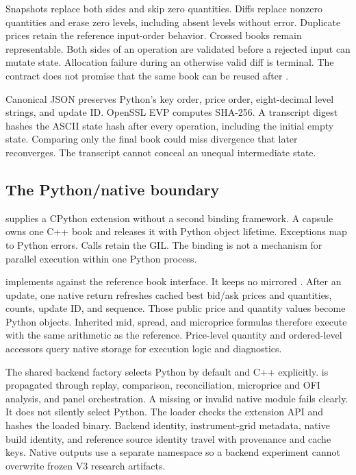 Snapshots replace both sides and skip zero quantities. Diffs replace nonzero
quantities and erase zero levels, including absent levels without error.
Duplicate prices retain the reference input-order behavior. Crossed books
remain representable. Both sides of an operation are validated before a
rejected input can mutate state. Allocation failure during an otherwise valid
diff is terminal. The contract does not promise that the same book can be
reused after .

Canonical JSON preserves Python's key order, price order, eight-decimal level
strings, and update ID. OpenSSL EVP computes SHA-256. A transcript digest
hashes the ASCII state hash after every operation, including the initial empty
state. Comparing only the final book could miss divergence that later
reconverges. The transcript cannot conceal an unequal intermediate state.

\subsection{The Python/native boundary}

 supplies a CPython extension without a second
binding framework. A capsule owns one C++ book and releases it with Python
object lifetime. Exceptions map to Python errors. Calls retain the GIL. The
binding is not a mechanism for parallel execution within one Python process.

 implements  against the
reference book interface. It keeps no mirrored . After an
update, one native return refreshes cached best bid/ask prices and quantities,
counts, update ID, and sequence. Those public price and quantity values become
Python  objects. Inherited mid, spread, and microprice formulas
therefore execute with the same arithmetic as the reference. Price-level
quantity and ordered-level accessors query native storage for execution logic
and diagnostics.

The shared backend factory selects Python by default and C++ explicitly.
 is propagated through replay, comparison,
reconciliation, microprice and OFI analysis, and panel orchestration. A missing
or invalid native module fails clearly. It does not silently select Python.
The loader checks the extension API and hashes the loaded binary. Backend
identity, instrument-grid metadata, native build identity, and reference
source identity travel with provenance and cache keys. Native outputs use a
separate namespace so a backend experiment cannot overwrite frozen V3
research artifacts.

